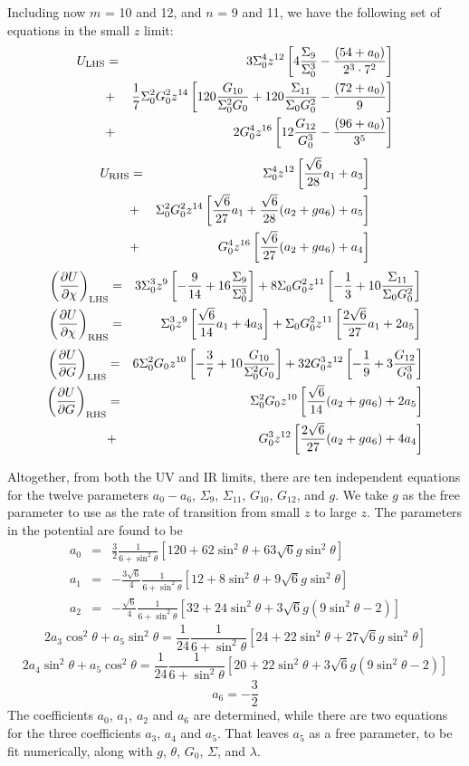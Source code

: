 \documentclass[12pt]{article}
\newcommand{\be}{\begin{equation}}
\newcommand{\ee}{\end{equation}}
\newcommand{\ba}{\begin{eqnarray}}
\newcommand{\ea}{\end{eqnarray}}
\def\rt6{\sqrt{6}}
\begin{document}
Including now $m$ = 10 and 12, and $n$ = 9 and 11, we have the following set of equations in the small $z$ limit:
\ba
U_{\rm LHS} &=& 3 \Sigma_0^4 z^{12} \left[ 4 \frac{\Sigma_9}{\Sigma_0^3} - \frac{(54+a_0)}{2^3 \cdot 7^2} \right] \nonumber \\
&+& \frac{1}{7} \Sigma_0^2 G_0^2 z^{14} \left[ 120 \frac{G_{10}}{\Sigma_0^2 G_0} + 120 \frac{\Sigma_{11}}{\Sigma_0 G_0^2} - \frac{(72+a_0)}{9} \right] \nonumber \\
&+& 2G_0^4 z^{16} \left[ 12 \frac{G_{12}}{G_0^3} - \frac{(96+a_0)}{3^5} \right]
\ea
\ba
U_{\rm RHS} &=& \Sigma_0^4 z^{12} \left[  \frac{\rt6}{28} a_1 + a_3\right] \nonumber \\
&+& \Sigma_0^2 G_0^2 z^{14} \left[ \frac{\rt6}{27} a_1 + \frac{\rt6}{28} (a_2 + g a_6) + a_5 \right] \nonumber \\
&+& G_0^4 z^{16} \left[ \frac{\rt6}{27} (a_2 + g a_6) + a_4 \right]
\ea
\ba
\left(\frac{\partial U}{\partial \chi}\right)_{\rm LHS} &=& 3 \Sigma_0^3 z^9 \left[ -\frac{9}{14} + 16 \frac{\Sigma_9}{\Sigma_0^3} \right]+ 8 \Sigma_0 G_0^2 z^{11} \left[ - \frac{1}{3} + 10 \frac{\Sigma_{11}}{\Sigma_0 G_0^2} \right]\\
\left(\frac{\partial U}{\partial \chi}\right)_{\rm RHS} &=& \Sigma_0^3 z^9 \left[ \frac{\rt6}{14} a_1 + 4 a_3  \right]+ \Sigma_0 G_0^2 z^{11} \left[  \frac{2\rt6}{27} a_1 + 2 a_5 \right]
\ea
\ba
\left(\frac{\partial U}{\partial G}\right)_{\rm LHS} &=& 6 \Sigma_0^2 G_0 z^{10} \left[ -\frac{3}{7} + 10 \frac{G_{10}}{\Sigma_0^2 G_0} \right]
+ 32 G_0^3 z^{12} \left[ - \frac{1}{9} + 3 \frac{G_{12}}{G_0^3} \right] \\
\left(\frac{\partial U}{\partial G}\right)_{\rm RHS} &=& \Sigma_0^2 G_0 z^{10} \left[ \frac{\rt6}{14} (a_2 + g a_6) + 2a_5 \right] \\
&+& G_0^3 z^{12} \left[ \frac{2\rt6}{27}  (a_2 + g a_6) + 4a_4 \right]
\ea

Altogether, from both the UV and IR limits, there are ten independent equations for the twelve parameters $a_0 - a_6$, $\Sigma_9$, $\Sigma_{11}$, $G_{10}$, $G_{12}$, and $g$.  
We take $g$ as the free parameter to use as the rate of transition from small $z$ to large $z$.  
The parameters in the potential are found to be
\ba
a_0 &=&  \frac{3}{2} \frac{1}{6 + \sin^2 \theta}\left[ 120 + 62 \sin^2 \theta + 63 \rt6 g \sin^2 \theta \right] \\
a_1 &=&  -\frac{3\rt6}{4} \frac{1}{6 + \sin^2 \theta}\left[ 12 + 8 \sin^2 \theta + 9 \rt6 g \sin^2 \theta \right] \\
a_2 &=&  -\frac{\rt6}{4} \frac{1}{6 + \sin^2 \theta}\left[ 32 + 24 \sin^2 \theta + 3 \rt6 g(9 \sin^2 \theta - 2) \right]
\ea
\be
2 a_3 \cos^2 \theta + a_5 \sin^2 \theta = \frac{1}{24} \frac{1}{6 + \sin^2 \theta}\left[ 24 + 22 \sin^2 \theta + 27 \rt6 g \sin^2 \theta \right] 
\ee
\be
2 a_4 \sin^2 \theta + a_5 \cos^2 \theta = \frac{1}{24} \frac{1}{6 + \sin^2 \theta}\left[ 20 +22 \sin^2 \theta   +  3 \rt6 g (9 \sin^2 \theta -2) \right]
\ee
\be
a_6 = -\frac{3}{2}
\ee
The coefficients $a_0$, $a_1$, $a_2$ and $a_6$ are determined, while there are two equations for the three coefficients $a_3$, $a_4$ and $a_5$.  
That leaves $a_5$ as a free parameter, to be fit numerically, along with $g$, $\theta$, $G_0$, $\Sigma$, and $\lambda$.
\end{document}
